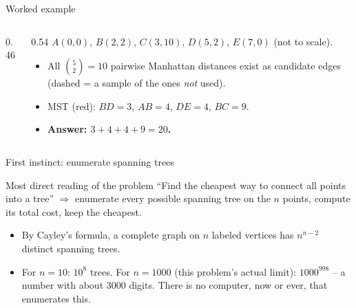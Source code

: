 \documentclass[11pt,aspectratio=169]{beamer}
\begin{document}
\begin{frame}{Worked example}
  \begin{columns}
  \begin{column}{0.46\textwidth}
  \begin{center}
  \end{center}
  \end{column}
  \begin{column}{0.54\textwidth}
  \scriptsize
  $A(0,0)$, $B(2,2)$, $C(3,10)$, $D(5,2)$, $E(7,0)$ (not to scale).
  \begin{itemize}
    \item All $\binom{5}{2}=10$ pairwise Manhattan distances exist as candidate
    edges (dashed = a sample of the ones \emph{not} used).
    \item MST (red): $BD{=}3$, $AB{=}4$, $DE{=}4$, $BC{=}9$.
    \item \textbf{Answer: $3+4+4+9=20$.}
  \end{itemize}
  \end{column}
  \end{columns}
\end{frame}

\begin{frame}{First instinct: enumerate spanning trees}
  \begin{block}{Most direct reading of the problem}
    ``Find the cheapest way to connect all points into a tree'' $\Rightarrow$
    enumerate every possible spanning tree on the $n$ points, compute its total
    cost, keep the cheapest.
  \end{block}
  \begin{itemize}
    \item By Cayley's formula, a complete graph on $n$ labeled vertices has
    $n^{n-2}$ distinct spanning trees.
    \item For $n=10$: $10^8$ trees. For $n=1000$ (this problem's actual limit):
    $1000^{998}$ -- a number with about 3000 digits. There is no computer, now
    or ever, that enumerates this.
  \end{itemize}
\end{frame}
\end{document}
